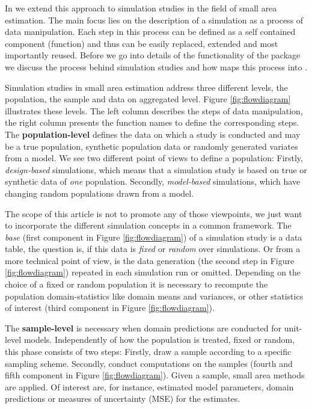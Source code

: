\documentclass[article]{ajs}
\begin{document}
In  we extend this approach to simulation studies in the field of small area estimation. The main focus lies on the description of a simulation as a process of data manipulation. Each step in this process can be defined as a self contained component (function) and thus can be easily replaced, extended and most importantly reused. Before we go into details of the functionality of the package we discuss the process behind simulation studies and how  maps this process into .

Simulation studies in small area estimation address three different levels, the population, the sample and data on aggregated level. Figure \ref{fig:flowdiagram} illustrates these levels. The left column describes the steps of data manipulation, the right column presents the function names to define the corresponding steps. The \textbf{population-level} defines the data on which a study is conducted and may be a true population, synthetic population data or randomly generated variates from a model. We see two different point of views to define a population: Firstly, \textit{design-based} simulations, which means that a simulation study is based on true or synthetic data of \textit{one} population. Secondly, \textit{model-based} simulations, which have changing random populations drawn from a model.

The scope of this article is not to promote any of those viewpoints, we just want to incorporate the different simulation concepts in a common framework. The \textit{base} (first component in Figure \ref{fig:flowdiagram}) of a simulation study is a data table, the question is, if this data is \textit{fixed} or \textit{random} over simulations. Or from a more technical point of view, is the data generation (the second step in Figure \ref{fig:flowdiagram}) repeated in each simulation run or omitted. Depending on the choice of a fixed or random population it is necessary to recompute the population domain-statistics like domain means and variances, or other statistics of interest (third component in Figure \ref{fig:flowdiagram}).

The \textbf{sample-level} is necessary when domain predictions are conducted for unit-level models. Independently of how the population is treated, fixed or random, this phase consists of two steps: Firstly, draw a sample according to a specific sampling scheme. Secondly, conduct computations on the samples (fourth and fifth component in Figure \ref{fig:flowdiagram}). Given a sample, small area methods are applied. Of interest are, for instance, estimated model parameters, domain predictions or measures of uncertainty (MSE) for the estimates.
\end{document}
